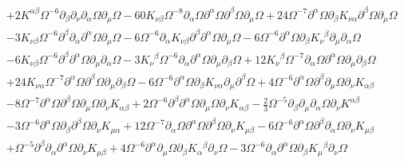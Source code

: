 \documentclass[aps]{revtex4}
\begin{document}
\begin{align}
 \nonumber\\
 &+ 2 K^{\alpha \beta} \Omega^{-6} \partial_{\beta}\partial_{\nu}\partial_{\alpha}\Omega \partial_{\mu}\Omega - 60 K_{\nu \beta} \Omega^{-8} \partial_{\alpha}\Omega \partial^{\alpha}\Omega \partial^{\beta}\Omega \partial_{\mu}\Omega + 24 \Omega^{-7} \partial^{\alpha}\Omega \partial_{\beta}K_{\nu \alpha} \partial^{\beta}\Omega \partial_{\mu}\Omega 
 \nonumber\\
 &- 3 K_{\nu \beta} \Omega^{-6} \partial^{\beta}\partial_{\alpha}\partial^{\alpha}\Omega \partial_{\mu}\Omega - 6 \Omega^{-6} \partial_{\alpha}K_{\nu \beta} \partial^{\beta}\partial^{\alpha}\Omega \partial_{\mu}\Omega - 6 \Omega^{-6} \partial^{\alpha}\Omega \partial_{\beta}K_{\nu}{}^{\beta} \partial_{\mu}\partial_{\alpha}\Omega 
 \nonumber\\
 &- 6 K_{\nu \beta} \Omega^{-6} \partial^{\beta}\partial^{\alpha}\Omega \partial_{\mu}\partial_{\alpha}\Omega - 3 K_{\nu}{}^{\beta} \Omega^{-6} \partial_{\alpha}\partial^{\alpha}\Omega \partial_{\mu}\partial_{\beta}\Omega + 12 K_{\nu}{}^{\beta} \Omega^{-7} \partial_{\alpha}\Omega \partial^{\alpha}\Omega \partial_{\mu}\partial_{\beta}\Omega 
\nonumber\\
&+ 24 K_{\nu \alpha} \Omega^{-7} \partial^{\alpha}\Omega \partial^{\beta}\Omega \partial_{\mu}\partial_{\beta}\Omega - 6 \Omega^{-6} \partial^{\alpha}\Omega \partial_{\beta}K_{\nu \alpha} \partial_{\mu}\partial^{\beta}\Omega + 4 \Omega^{-6} \partial^{\alpha}\Omega \partial^{\beta}\partial_{\mu}\Omega \partial_{\nu}K_{\alpha \beta} 
\nonumber\\
&- 8 \Omega^{-7} \partial^{\alpha}\Omega \partial^{\beta}\Omega \partial_{\mu}\Omega \partial_{\nu}K_{\alpha \beta} + 2 \Omega^{-6} \partial^{\beta}\partial^{\alpha}\Omega \partial_{\mu}\Omega \partial_{\nu}K_{\alpha \beta} -  \tfrac{2}{3} \Omega^{-5} \partial_{\beta}\partial_{\mu}\partial_{\alpha}\Omega \partial_{\nu}K^{\alpha \beta} 
\nonumber\\
&- 3 \Omega^{-6} \partial^{\alpha}\Omega \partial_{\beta}\partial^{\beta}\Omega \partial_{\nu}K_{\mu \alpha} + 12 \Omega^{-7} \partial_{\alpha}\Omega \partial^{\alpha}\Omega \partial^{\beta}\Omega \partial_{\nu}K_{\mu \beta} - 6 \Omega^{-6} \partial^{\alpha}\Omega \partial^{\beta}\partial_{\alpha}\Omega \partial_{\nu}K_{\mu \beta} 
\nonumber\\
&+ \Omega^{-5} \partial^{\beta}\partial_{\alpha}\partial^{\alpha}\Omega \partial_{\nu}K_{\mu \beta} + 4 \Omega^{-6} \partial^{\alpha}\partial_{\mu}\Omega \partial_{\beta}K_{\alpha}{}^{\beta} \partial_{\nu}\Omega - 3 \Omega^{-6} \partial_{\alpha}\partial^{\alpha}\Omega \partial_{\beta}K_{\mu}{}^{\beta} \partial_{\nu}\Omega 

\end{align}
\end{document}
